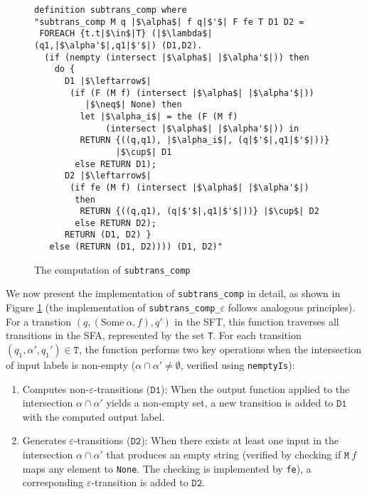 \begin{figure}[hbt!]
\begin{lstlisting}[language=SMTLIB]
definition subtrans_comp where
"subtrans_comp M q |$\alpha$| f q|$'$| F fe T D1 D2 =
 FOREACH {t.t|$\in$|T} (|$\lambda$| (q1,|$\alpha'$|,q1|$'$|) (D1,D2).
  (if (nempty (intersect |$\alpha$| |$\alpha'$|)) then
    do {
      D1 |$\leftarrow$| 
       (if (F (M f) (intersect |$\alpha$| |$\alpha'$|)) 
          |$\neq$| None) then
         let |$\alpha_i$| = the (F (M f) 
              (intersect |$\alpha$| |$\alpha'$|)) in
         RETURN {((q,q1), |$\alpha_i$|, (q|$'$|,q1|$'$|))} 
                |$\cup$| D1
        else RETURN D1);
      D2 |$\leftarrow$| 
       (if fe (M f) (intersect |$\alpha$| |$\alpha'$|) 
        then 
         RETURN {((q,q1), (q|$'$|,q1|$'$|))} |$\cup$| D2 
        else RETURN D2);
      RETURN (D1, D2) }
   else (RETURN (D1, D2)))) (D1, D2)"
    \end{lstlisting}
    \caption{The computation of \texttt{subtrans\_comp}}
    \label{fig-def-subtrans_comp}
    \end{figure}


    We now present the implementation of \texttt{subtrans\_comp} in detail, as shown in Figure \ref{fig-def-subtrans_comp} (the implementation of \texttt{subtrans\_comp\_$\varepsilon$} follows analogous principles). For a transtion $(q, (\text{Some}~\alpha, f), q')$ in the SFT, this function traverses all transitions in the SFA, represented by the set \texttt{T}. For each transition $(q_1, \alpha', q_1')\in \texttt{T}$, the function performs two key operations when the intersection of input labels is non-empty ($\alpha \cap \alpha' \neq \emptyset$, verified using \texttt{nemptyIs}):

    \begin{enumerate}
      \item Computes non-$\varepsilon$-transitions ($\texttt{D1}$): When the output function applied to the intersection $\alpha \cap \alpha'$ yields a non-empty set, a new transition is added to $\texttt{D1}$ with the computed output label.
      \item Generates $\varepsilon$-transitions ($\texttt{D2}$): When there exists at least one input in the intersection $\alpha \cap \alpha'$ that produces an empty string (verified by checking if $\texttt{M}~f$ maps any element to \texttt{None}. The checking is implemented by \texttt{fe}), a corresponding $\varepsilon$-transition is added to $\texttt{D2}$.
    \end{enumerate}
    

